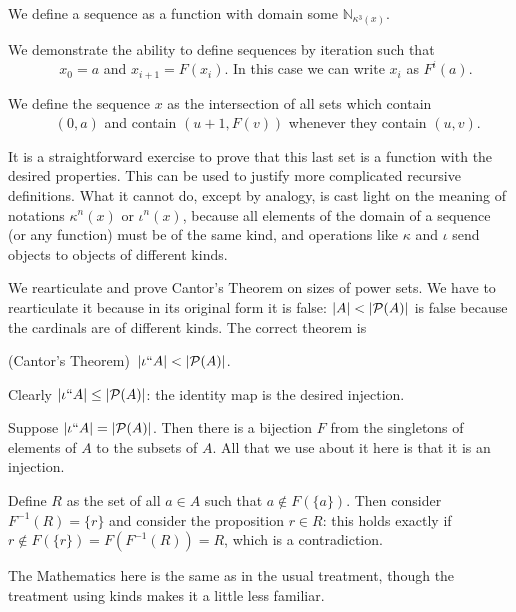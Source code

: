 \documentclass[12pt]{article}
\begin{document}
  \begin{dfn}\mbox{\negthinspace}
    
    We define a sequence as a function with domain some ${\mathbb N}_{\kappa^3(x)}$.

    We demonstrate the ability to define sequences by iteration such that\\ \mbox{\, \, \, \, \, }
    $x_0 = a$ and $x_{i+1} = F(x_i)$.    In this case we can write $x_i$ as $F^i(a)$.

    We define the sequence $x$ as the intersection of all sets which contain \\ \mbox{\, \, \, \, \, }$(0,a)$ and contain $(u+1,F(v))$ whenever they contain  $(u,v)$.\end{dfn}

  It is a straightforward exercise to prove that this last set is a function with the desired properties.  This can be used to justify more complicated recursive definitions.  What it cannot do, except by analogy, is cast light on the meaning of notations $\kappa^n(x)$ or $\iota^n(x)$, because all elements of the domain of a sequence (or any function) must be of the same kind, and operations like $\kappa$ and $\iota$ send objects to objects of different kinds.

  \medskip


  We rearticulate and prove Cantor's Theorem on sizes of power sets.  We have to rearticulate it because in its original form it is false:  $|A| < |{\cal P}(A)|$ is false because the cardinals are of different kinds.  The correct theorem is\begin{thm} (Cantor's Theorem)\,  $|\iota``A|<|{\cal P}(A)|$.
\end{thm}
  \Proof

  Clearly $|\iota``A| \leq |{\cal P}(A)|$:  the identity map is the desired injection. 

Suppose  $|\iota``A| = |{\cal P}(A)|$.  Then there is a bijection $F$ from the singletons of elements of $A$ to the subsets of $A$.
All that we use about it here is that it is an injection.

Define $R$ as the set of all $a \in A$ such that $a \not\in F(\{a\})$.  Then consider $F^{-1}(R) = \{r\}$ and consider the proposition $r \in R$:  this holds exactly if $r \not\in F(\{r\})  = F(F^{-1}(R)) = R$, which is a contradiction.

\endproof


The Mathematics here is the same as in the usual treatment, though the treatment using kinds makes it a little less familiar.
\end{document}

